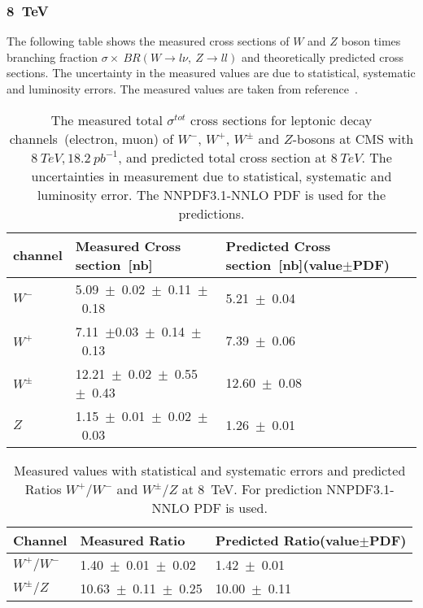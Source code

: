 \documentclass[a4paper,12pt]{report}
\numberwithin{equation}{section}
\begin{document}
\subsubsection{8~TeV}
The following table shows the measured cross sections of $W$ and $Z$ boson times branching fraction $\sigma\times~BR(W\rightarrow l\nu,~Z\rightarrow ll)$ and theoretically predicted cross sections. The uncertainty in the measured values are due to statistical, systematic and luminosity errors. The measured values are taken from reference~\cite{Chatrchyan_2014}. 
\begin{table}[H]
\caption{The measured total $\sigma^{tot}$ cross sections for leptonic decay channels~(electron, muon) of $W^{-}$, $W^{+}$, $W^{\pm}$ and $Z$-bosons at CMS with $8~TeV, 18.2~pb^{-1}$, and predicted total cross section at $8~TeV$. The uncertainties in measurement due to statistical, systematic and luminosity error. The NNPDF3.1-NNLO PDF is used for the predictions.}
\centering
\begin{tabular}{|l|p{6cm}|p{6cm}| }
\hline
channel&\bf Measured Cross section~[nb]&\bf Predicted Cross section~[nb]\newline (value$\pm$PDF)\\
\hline
\hline
$W^{-}$&5.09~$\pm$~0.02~$\pm$~0.11~$\pm$~0.18&5.21~$\pm$~0.04\\
$W^{+}$&7.11~$\pm$0.03~$\pm$~0.14~$\pm$~0.13&7.39~$\pm$~0.06\\
$W^{\pm}$&12.21~$\pm$~0.02~$\pm$~0.55~$\pm$~0.43&12.60~$\pm$~0.08\\
\hline
\hline
$Z$&1.15~$\pm$~0.01~$\pm$~0.02~$\pm$~0.03&1.26~$\pm$~0.01\\
\hline

\end{tabular}

\end{table}

\begin{table}[H]
\caption{Measured values with statistical and systematic errors and predicted Ratios $W^{+}/W^{-}$ and $W^{\pm}/Z$ at 8~TeV. For prediction NNPDF3.1-NNLO PDF is used.}
\centering
\begin{tabular}{|l|p{6cm}|p{6cm}|}
\hline
Channel&\bf Measured Ratio&\bf Predicted Ratio\newline(value$\pm$PDF)\\
\hline
\hline
$W^{+}/W^{-}$&1.40~$\pm$~0.01~$\pm$~0.02&1.42~$\pm$~0.01~\\
$W^{\pm}/Z$&10.63~$\pm$~0.11~$\pm$~0.25&10.00~$\pm$~0.11\\
\hline
\end{tabular}
\end{table}
\end{document}
